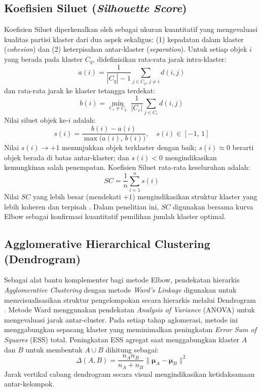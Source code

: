 \subsection{\normalsize Koefisien Siluet (\textit{Silhouette Score})}
\label{subsec:silhouette}

Koefisien Siluet diperkenalkan oleh \citet{rousseeuw1987} sebagai ukuran kuantitatif yang mengevaluasi kualitas partisi klaster dari dua aspek sekaligus: (1) kepadatan dalam klaster (\textit{cohesion}) dan (2) keterpisahan antar-klaster (\textit{separation}). Untuk setiap objek $i$ yang berada pada klaster $C_q$, didefinisikan rata-rata jarak intra-klaster:
\begin{equation}\label{eq:silhouette_a}
  a(i) = \frac{1}{|C_q|-1} \sum_{j \in C_q,\, j \neq i} d(i,j)
\end{equation}
dan rata-rata jarak ke klaster tetangga terdekat:
\begin{equation}\label{eq:silhouette_b}
  b(i) = \min_{C_r \neq C_q}\; \frac{1}{|C_r|} \sum_{j \in C_r} d(i,j)
\end{equation}
Nilai siluet objek ke-$i$ adalah:
\begin{equation}\label{eq:silhouette_si}
  s(i) = \frac{b(i) - a(i)}{\max\!\bigl(a(i),\, b(i)\bigr)}, \quad s(i) \in [-1,\,1]
\end{equation}
Nilai $s(i) \to +1$ menunjukkan objek terklaster dengan baik; $s(i) \approx 0$ berarti objek berada di batas antar-klaster; dan $s(i) < 0$ mengindikasikan kemungkinan salah penempatan. Koefisien Siluet rata-rata keseluruhan adalah:
\begin{equation}\label{eq:silhouette_sc}
  SC = \frac{1}{n} \sum_{i=1}^{n} s(i)
\end{equation}
Nilai $SC$ yang lebih besar (mendekati $+1$) mengindikasikan struktur klaster yang lebih koheren dan terpisah \citep{rousseeuw1987}. Dalam penelitian ini, $SC$ digunakan bersama kurva Elbow sebagai konfirmasi kuantitatif pemilihan jumlah klaster optimal.

\subsection{\normalsize Agglomerative Hierarchical Clustering (Dendrogram)}

Sebagai alat bantu komplementer bagi metode Elbow, pendekatan hierarkis \textit{Agglomerative Clustering} dengan metode \textit{Ward's Linkage} digunakan untuk memvisualisasikan struktur pengelompokan secara hierarkis melalui Dendrogram \citep{ward1963}. Metode Ward menggunakan pendekatan \textit{Analysis of Variance} (ANOVA) untuk mengevaluasi jarak antar-cluster. Pada setiap tahap aglomerasi, metode ini menggabungkan sepasang klaster yang meminimalkan peningkatan \textit{Error Sum of Squares} (ESS) total. Peningkatan ESS agregat saat menggabungkan klaster $A$ dan $B$ untuk membentuk $A \cup B$ dihitung sebagai:
\begin{equation}
  \Delta(A, B) = \frac{n_A n_B}{n_A + n_B} \| \boldsymbol{\mu}_A - \boldsymbol{\mu}_B \|^2
\end{equation}
Jarak vertikal cabang dendrogram secara visual mengindikasikan ketidaksamaan antar-kelompok.

